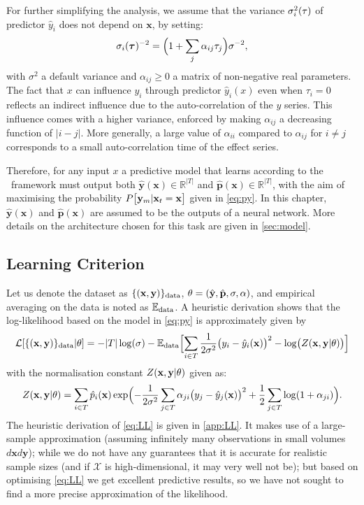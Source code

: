 For further simplifying the analysis, we assume that the variance $\sigma_i^2({\bf \tau})$ of 
predictor $\hat y_i$ does not depend on $\mathbf{x}$, by setting:
\[
\sigma_i(\boldsymbol{\tau})^{-2} = \Bigl(1+\sum_j\alpha_{ij} \tau_j\Bigr)\sigma^{-2},
\]
with $\sigma^2$ a default variance and $\alpha_{ij}\ge 0$ a matrix of non-negative real parameters. 
The fact that $x$ can influence $y_i$ through predictor $\hat y_i(x)$ even when $\tau_i=0$ reflects 
an indirect influence due to the auto-correlation of the $y$ series. This influence comes with a 
higher variance, enforced by making $\alpha_{ij}$ a decreasing function of $\vert i-j\vert$. More 
generally, a large value of $\alpha_{ii}$ compared to $\alpha_{ij}$ for $i\ne j$ corresponds to a 
small auto-correlation time of the effect series. 

Therefore, for any input $x$ a predictive model that learns according to the \XX \ framework must 
output both $\hat{\mathbf{y}}(\mathbf{x}) \in \mathbb{R}^{\rvert T \rvert}$ and 
$\hat{\mathbf{p}}(\mathbf{x}) \in \mathbb{R}^{\rvert T \rvert}$, with the aim of maximising the probability 
$P\bigl[{\bf y}_{m}\vert \mathbf{x}_t=\mathbf{x}\bigr]$ given in \cref{eq:py}. In this chapter, 
$\hat{\mathbf{y}}(\mathbf{x})$ and $\hat{\mathbf{p}}(\mathbf{x})$ are assumed to be the outputs of a neural network.
More details on the architecture chosen for this task are given in \cref{sec:model}.

\subsection{Learning Criterion}

Let us denote the dataset as $\{(\mathbf{x},{\bf y})\}_{\rm data}$, 
$\theta = (\hat {\bf y},\hat{\bf p},\sigma,\alpha)$, and empirical averaging on the 
data is noted as ${\mathbb E}_{\rm data}$.
%
A heuristic derivation shows that the log-likelihood based on the model in \cref{eq:py} is 
approximately given by
%
\begin{equation}\label{eq:LL}
  {\cal L}[\{(\mathbf{x},{\bf y})\}_{\rm data}\vert\theta] = -\vert T\vert\log(\sigma)-{\mathbb E}_{\rm data}
  \Bigl[\sum_{i\in T}\frac{1}{2\sigma^2}\bigl(y_i-\hat y_i(\mathbf{x})\bigr)^2-\log\bigl(Z(\mathbf{x},{\bf y}\vert\theta)\bigr)\Bigr]
\end{equation}
%
with the normalisation constant $Z(\mathbf{x},{\bf y}\vert\theta)$ given as:
\[
Z(\mathbf{x},{\bf y}\vert\theta) = \sum_{i\in T}  \hat p_i(\mathbf{x})\exp\Bigl(-\frac{1}{2\sigma^2}\sum_{j\in T}\alpha_{ji}\bigl(y_j-\hat y_j(\mathbf{x})\bigr)^2+\frac{1}{2}\sum_{j\in T}\log(1+\alpha_{ji})\Bigr).
\]
The heuristic derivation of \cref{eq:LL} is given in \cref{app:LL}. It makes use of a large-sample 
approximation (assuming infinitely many observations in small volumes $d\mathbf{x} d\mathbf{y}$); while we 
do not have any guarantees that it is accurate for realistic sample sizes (and if $\mathcal{X}$ is 
high-dimensional, it may very well not be); but based on optimising \cref{eq:LL} we get 
excellent predictive results, so we have not sought to find a more precise approximation of 
the likelihood.

